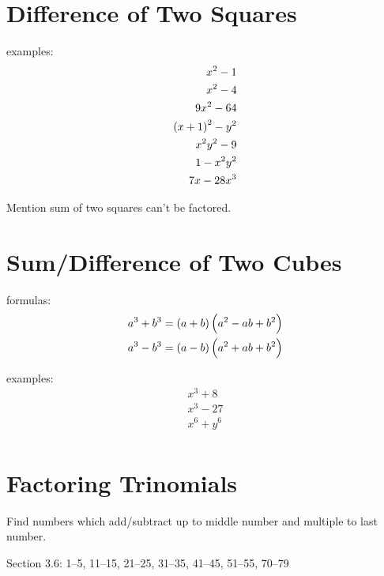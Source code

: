 \documentclass[letterpaper, landscape]{exam}
\begin{document}
  \section{Difference of Two Squares}

  examples:
  \begin{align*}
    x^2 - 1 \\
    x^2 - 4 \\
    9x^2 - 64 \\
    \del{x + 1}^2 - y^2 \\
    x^2y^2 - 9 \\
    1 - x^2y^2 \\
    7x - 28x^3 \\
  \end{align*}

  Mention sum of two squares can't be factored.

  \section{Sum/Difference of Two Cubes}

  formulas:
  \begin{align*}
    a^3 + b^3 &= (a + b) \del{a^2 - ab + b^2} \\
    a^3 - b^3 &= (a - b) \del{a^2 + ab + b^2} \\
  \end{align*}

  examples:
  \begin{align*}
    x^3 + 8 \\
    x^3 - 27 \\
    x^6 + y^6 \\
  \end{align*}
  
  \section{Factoring Trinomials} %

  Find numbers which add/subtract up to middle number and multiple to last number.

  Section 3.6: 1--5, 11--15, 21--25, 31--35, 41--45, 51--55, 70--79
  
\end{document}
